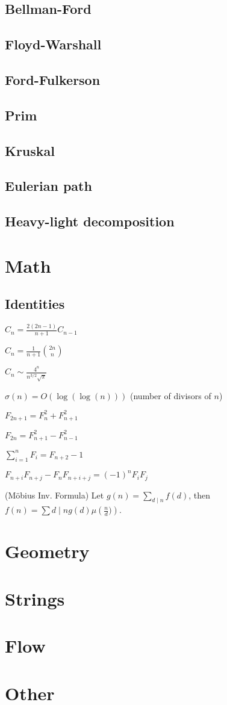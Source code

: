\subsection{ Bellman-Ford }
\subsection{ Floyd-Warshall }
\subsection{ Ford-Fulkerson }
\subsection{ Prim }
\subsection{ Kruskal }
\subsection{ Eulerian path }
\subsection{ Heavy-light decomposition }

\section{Math}
\subsection{Identities}
{
	$C_n = \frac{2(2n-1)}{n+1} C_{n-1}$

	$C_n = \frac{1}{n+1} \binom{2n}{n}$

	$C_n \sim \frac{4^n}{n^{3/2}\sqrt{\pi}}$

	$\sigma(n) = O(\log(\log(n)))$ (number of divisors of $n$)

	$F_{2n+1} = F_{n}^2 + F_{n+1}^2$

	$F_{2n} = F_{n+1}^2 - F_{n-1}^2$

	$\sum_{i=1}^n F_i = F_{n+2}-1$

	$F_{n+i}F_{n+j} - F_nF_{n+i+j} = (-1)^n F_iF_j$

	(Möbius Inv. Formula)
	Let $g(n) = \sum_{d\mid n} f(d)$, then $f(n)=\sum{d\mid n} g(d) \mu\left(\frac{n}{d})\right)$.
}

\section{Geometry}
\section{Strings}

\section{Flow}

\section{Other}

